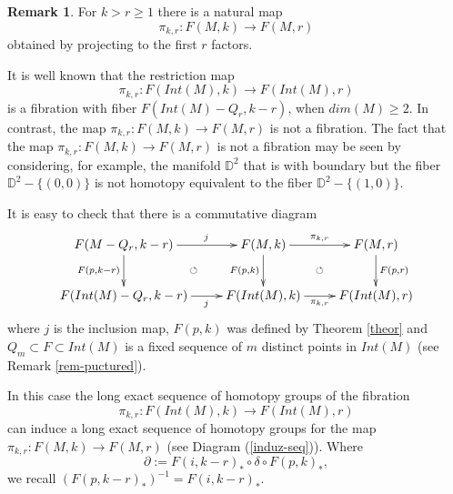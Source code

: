 \documentclass{amsart}
\theoremstyle{definition}
\newtheorem{rem}[thm]{Remark}
\numberwithin{equation}{section}
\begin{document}
\begin{rem}
For $k>r\geq 1$ there is a natural map
\begin{equation}
\pi_{k,r}:F(M,k)\longrightarrow F(M,r)
\end{equation} obtained by projecting to the first $r$ factors. 

It is well known that the restriction map \begin{equation}
\pi_{k,r}:F(Int(M),k)\longrightarrow F(Int(M),r)
\end{equation} is a fibration with fiber $F(Int(M)-Q_r,k-r)$, when $dim(M)\geq 2$. In contrast, the map $\pi_{k,r}:F(M,k)\longrightarrow F(M,r)$ is not a fibration. The fact that the map $\pi_{k,r}:F(M,k)\longrightarrow F(M,r)$ is not a fibration may be seen by considering, for example, the manifold $\mathbb{D}^2$ that is with boundary but the fiber $\mathbb{D}^2-\{(0,0)\}$ is not homotopy equivalent to the fiber $\mathbb{D}^2-\{(1,0)\}$.

It is easy to check that there is a commutative diagram 
\begin{equation}
\xymatrix{ F(M-Q_r,k-r) \ar[d]_{F(p,k-r)} \ar[r]^{\quad\quad j} \ar@{}[dr]|{\circlearrowleft} & 
F(M,k) \ar[d]_{F(p,k)} \ar[r]^{\pi_{k,r}} \ar@{}[dr]|{\circlearrowleft} & F(M,r) \ar[d]^{F(p,r)} \\ F(Int(M)-Q_r,k-r) \ar[r]_{\quad\quad j} & F(Int(M),k) \ar[r]_{\pi_{k,r}} & F(Int(M),r)
}
\end{equation}
where $j$ is the inclusion map, $F(p,k)$ was defined by Theorem \ref{theor} and $Q_m\subset F\subset Int(M)$ is a fixed sequence of $m$ distinct points in $Int(M)$ (see Remark \ref{rem-puctured}). 

In this case the long exact sequence of homotopy groups of the fibration  \[\pi_{k,r}:F(Int(M),k)\longrightarrow F(Int(M),r)\] can induce a long exact sequence of homotopy groups for the map  $\pi_{k,r}:F(M,k)\longrightarrow F(M,r)$ (see Diagram (\ref{induz-seq})). Where \begin{equation} \partial:=F(i,k-r)_\ast \circ \delta\circ F(p,k)_\ast, \end{equation} we recall $(F(p,k-r)_\ast)^{-1}=F(i,k-r)_\ast$.
\end{rem}
\end{document}
